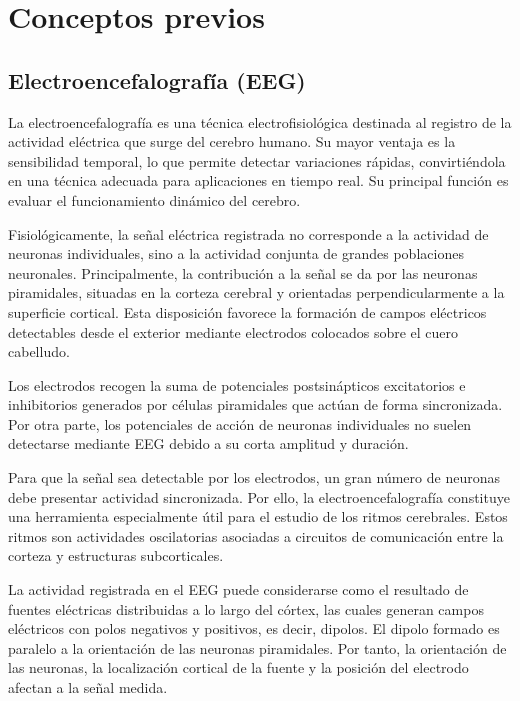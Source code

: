 \documentclass[../main.tex]{subfiles}
\begin{document}
\section{Conceptos previos}   

\subsection{Electroencefalografía (EEG)}

La electroencefalografía es una técnica electrofisiológica destinada al registro de la actividad eléctrica que surge del cerebro humano. Su mayor ventaja es la sensibilidad temporal, lo que permite detectar variaciones rápidas, convirtiéndola en una técnica adecuada para aplicaciones en tiempo real. Su principal función es evaluar el funcionamiento dinámico del cerebro.

Fisiológicamente, la señal eléctrica registrada no corresponde a la actividad de neuronas individuales, sino a la actividad conjunta de grandes poblaciones neuronales. Principalmente, la contribución a la señal se da por las neuronas piramidales, situadas en la corteza cerebral y orientadas perpendicularmente a la superficie cortical. Esta disposición favorece la formación de campos eléctricos detectables desde el exterior mediante electrodos colocados sobre el cuero cabelludo.

Los electrodos recogen la suma de potenciales postsinápticos excitatorios e inhibitorios generados por células piramidales que actúan de forma sincronizada. Por otra parte, los potenciales de acción de neuronas individuales no suelen detectarse mediante EEG debido a su corta amplitud y duración.

Para que la señal sea detectable por los electrodos, un gran número de neuronas debe presentar actividad sincronizada. Por ello, la electroencefalografía constituye una herramienta especialmente útil para el estudio de los ritmos cerebrales. Estos ritmos son actividades oscilatorias asociadas a circuitos de comunicación entre la corteza y estructuras subcorticales.

La actividad registrada en el EEG puede considerarse como el resultado de fuentes eléctricas distribuidas a lo largo del córtex, las cuales generan campos eléctricos con polos negativos y positivos, es decir, dipolos. El dipolo formado es paralelo a la orientación de las neuronas piramidales. Por tanto, la orientación de las neuronas, la localización cortical de la fuente y la posición del electrodo afectan a la señal medida.
\end{document}
